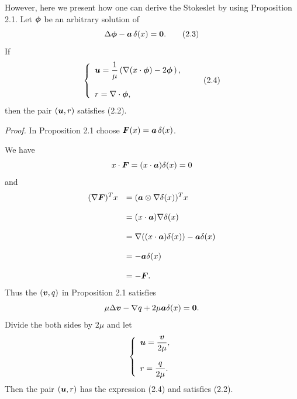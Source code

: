 However,  here we present how one can derive the Stokeslet by using Proposition 2.1.
Let  $\mbox{\boldmath $\phi$}$ be an arbitrary  solution of
$$
\Delta\mbox{\boldmath $\phi$}-\mbox{\boldmath $a$}\,\delta(x)=\mbox{\boldmath $0$}.
\tag {2.3}
$$
If
$$\left\{
\begin{array}{l}
\displaystyle
\mbox{\boldmath $u$}=\frac{1}{\mu}
\left(\nabla(x\cdot\mbox{\boldmath $\phi$})-2\mbox{\boldmath $\phi$}\,\right),
\\
\\
\displaystyle
r=\nabla\cdot\mbox{\boldmath $\phi$},
\end{array}
\right.
\tag {2.4}
$$
then the pair $(\mbox{\boldmath $u$},r)$ satisfies (2.2).



\endproclaim
{\it\noindent Proof.}
In Proposition 2.1 choose $\mbox{\boldmath $F$}(x)=\mbox{\boldmath $a$}\,\delta(x)$.

\noindent
We have
$$\displaystyle
x\cdot\mbox{\boldmath $F$}
=(x\cdot\mbox{\boldmath $a$})\delta(x)=0
$$
and
$$\begin{array}{ll}
\displaystyle
(\nabla\mbox{\boldmath $F$})^Tx
&
\displaystyle
=(\mbox{\boldmath $a$}\otimes\nabla\delta(x))^Tx\\
\\
\displaystyle
&
\displaystyle
=(x\cdot\mbox{\boldmath $a$})\nabla\delta(x)\\
\\
\displaystyle
&
\displaystyle
=\nabla((x\cdot\mbox{\boldmath $a$})\delta(x))-\mbox{\boldmath $a$}\delta(x)\\
\\
\displaystyle
&
\displaystyle
=-\mbox{\boldmath $a$}\delta(x)\\
\\
\displaystyle
&
\displaystyle
=-\mbox{\boldmath $F$}.
\end{array}
$$
Thus the $(\mbox{\boldmath $v$},q)$ in Proposition 2.1 satisfies
$$\displaystyle
\mu\Delta\mbox{\boldmath $v$}-\nabla q+2\mu\mbox{\boldmath $a$}\delta(x)=\mbox{\boldmath $0$}.
$$
Divide the both sides by $2\mu$ and let
$$\left\{
\begin{array}{l}
\displaystyle
\mbox{\boldmath $u$}=\frac{\mbox{\boldmath $v$}}{2\mu},
\\
\\
\displaystyle
r=\frac{q}{2\mu}.
\end{array}
\right.
$$
Then the pair $(\mbox{\boldmath $u$},r)$ has the expression (2.4) and satisfies  (2.2).

